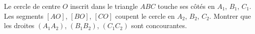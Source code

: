 Le cercle de centre $O$ inscrit dans le triangle $ABC$ touche ses côtés en $A_1$, $B_1$, $C_1$. Les segments $[AO]$, $[BO]$, $[CO]$ coupent le cercle en $A_2$, $B_2$, $C_2$. Montrer que les droites $(A_1A_2)$, $(B_1B_2)$, $(C_1C_2)$ sont concourantes.
